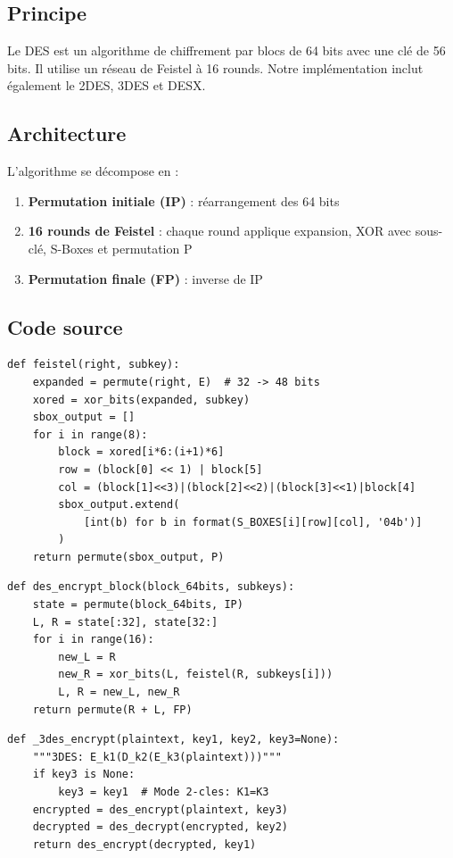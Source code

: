 \documentclass[12pt,a4paper]{report}
\begin{document}
\subsection{Principe}
Le DES est un algorithme de chiffrement par blocs de 64 bits avec une clé de 56 bits. Il utilise un réseau de Feistel à 16 rounds. Notre implémentation inclut également le 2DES, 3DES et DESX.

\subsection{Architecture}
L'algorithme se décompose en :
\begin{enumerate}
    \item \textbf{Permutation initiale (IP)} : réarrangement des 64 bits
    \item \textbf{16 rounds de Feistel} : chaque round applique expansion, XOR avec sous-clé, S-Boxes et permutation P
    \item \textbf{Permutation finale (FP)} : inverse de IP
\end{enumerate}

\subsection{Code source}
\begin{lstlisting}[style=python,caption=DES.py - Fonction de Feistel]
def feistel(right, subkey):
    expanded = permute(right, E)  # 32 -> 48 bits
    xored = xor_bits(expanded, subkey)
    sbox_output = []
    for i in range(8):
        block = xored[i*6:(i+1)*6]
        row = (block[0] << 1) | block[5]
        col = (block[1]<<3)|(block[2]<<2)|(block[3]<<1)|block[4]
        sbox_output.extend(
            [int(b) for b in format(S_BOXES[i][row][col], '04b')]
        )
    return permute(sbox_output, P)
\end{lstlisting}

\begin{lstlisting}[style=python,caption=DES.py - Chiffrement d'un bloc]
def des_encrypt_block(block_64bits, subkeys):
    state = permute(block_64bits, IP)
    L, R = state[:32], state[32:]
    for i in range(16):
        new_L = R
        new_R = xor_bits(L, feistel(R, subkeys[i]))
        L, R = new_L, new_R
    return permute(R + L, FP)
\end{lstlisting}

\begin{lstlisting}[style=python,caption=DES.py - Triple DES]
def _3des_encrypt(plaintext, key1, key2, key3=None):
    """3DES: E_k1(D_k2(E_k3(plaintext)))"""
    if key3 is None:
        key3 = key1  # Mode 2-cles: K1=K3
    encrypted = des_encrypt(plaintext, key3)
    decrypted = des_decrypt(encrypted, key2)
    return des_encrypt(decrypted, key1)
\end{lstlisting}
\end{document}
